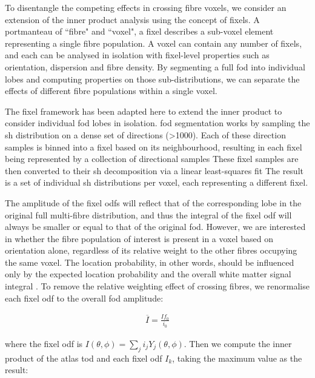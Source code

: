 To disentangle the competing effects in crossing fibre voxels, we consider an extension of the inner product analysis using the concept of fixels.
A portmanteau of ``fibre" and ``voxel", a fixel describes a sub-voxel element representing a single fibre population.
A voxel can contain any number of fixels, and each can be analysed in isolation with fixel-level properties such as orientation, dispersion and fibre density.
By segmenting a full \gls{fod} into individual lobes and computing properties on those sub-distributions, we can separate the effects of different fibre populations within a single voxel.

The fixel framework has been adapted here to extend the inner product to consider individual \gls{fod} lobes in isolation.
\gls{fod} segmentation works by sampling the \gls{sh} distribution on a dense set of directions (>1000).
Each of these direction samples is binned into a fixel based on its neighbourhood, resulting in each fixel being represented by a collection of directional samples 
These fixel samples are then converted to their \gls{sh} decomposition via a linear least-squares fit 
The result is a set of individual \gls{sh} distributions per voxel, each representing a different fixel.

The amplitude of the fixel \glspl{odf} will reflect that of the corresponding lobe in the original full multi-fibre distribution, and thus the integral of the fixel \gls{odf} will always be smaller or equal to that of the original \gls{fod}.
However, we are interested in whether the fibre population of interest is present in a voxel based on orientation alone, regardless of its relative weight to the other fibres occupying the same voxel.
The location probability, in other words, should be influenced only by the expected location probability  and the overall white matter signal integral .
To remove the relative weighting effect of crossing fibres, we renormalise each fixel \gls{odf} to the overall \gls{fod} amplitude:

\begin{align}
  \overline{I} = \frac{I f_0}{i_0}
\end{align}

where the fixel \gls{odf} is $I(\theta, \phi) = \sum_j i_j Y_j(\theta,\phi)$.
Then we compute the inner product of the atlas \gls{tod} and each fixel \gls{odf} $I_k$, taking the maximum value as the result:

